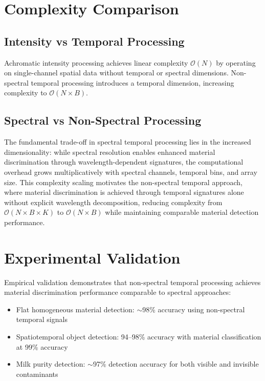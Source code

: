 \documentclass[10pt,twocolumn]{article}
\begin{document}
\section{Complexity Comparison}

\subsection{Intensity vs Temporal Processing}

Achromatic intensity processing achieves linear complexity $\mathcal{O}(N)$ by operating on single-channel spatial data without temporal or spectral dimensions. Non-spectral temporal processing introduces a temporal dimension, increasing complexity to $\mathcal{O}(N \times B)$.

\subsection{Spectral vs Non-Spectral Processing}

The fundamental trade-off in spectral temporal processing lies in the increased dimensionality: while spectral resolution enables enhanced material discrimination through wavelength-dependent signatures, the computational overhead grows multiplicatively with spectral channels, temporal bins, and array size. This complexity scaling motivates the non-spectral temporal approach, where material discrimination is achieved through temporal signatures alone without explicit wavelength decomposition, reducing complexity from $\mathcal{O}(N \times B \times K)$ to $\mathcal{O}(N \times B)$ while maintaining comparable material detection performance.

\section{Experimental Validation}

Empirical validation demonstrates that non-spectral temporal processing achieves material discrimination performance comparable to spectral approaches:

\begin{itemize}
    \item Flat homogeneous material detection: $\sim$98\% accuracy using non-spectral temporal signals
    \item Spatiotemporal object detection: 94--98\% accuracy with material classification at 99\% accuracy
    \item Milk purity detection: $\sim$97\% detection accuracy for both visible and invisible contaminants
\end{itemize}
\end{document}
